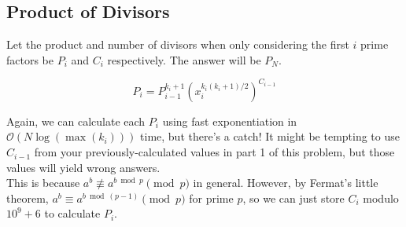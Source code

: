 \subsection{Product of Divisors}

Let the product and number of divisors when only considering the first $i$ prime factors be $P_i$ and $C_i$ respectively. The answer will be $P_N$.

$$P_i = P_{i - 1}^{k_{i} + 1} \left( x_{i}^{k_{i}(k_i + 1)/2} \right)^{C_{i - 1}}$$

Again, we can calculate each $P_i$ using fast exponentiation in $\mathcal O(N \log(\max(k_i)))$ time, but there's a catch! It might be tempting to use $C_{i - 1}$ from your previously-calculated values in part 1 of this problem, but those values will yield wrong answers.\\
\hfill \break
This is because $a^b \not \equiv a^{b \bmod p} \pmod{p}$ in general. However, by Fermat's little theorem, $a^b \equiv a^{b \bmod (p - 1)} \pmod{p}$ for prime $p$, so we can just store $C_i$ modulo $10^9 + 6$ to calculate $P_i$.